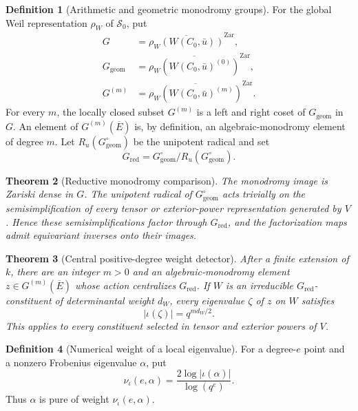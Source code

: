 \documentclass[10pt]{article}
\newtheorem{theorem}{Theorem}[section]
\theoremstyle{definition}
\newtheorem{definition}[theorem]{Definition}
\begin{document}
\begin{definition}[Arithmetic and geometric monodromy groups]
For the global Weil representation \(\rho_W\) of \(\mathcal S_0\), put
\[
 \begin{aligned}
 G&=\overline{\rho_W(W(C_0,\bar u))}^{\mathrm{Zar}},\\
 G_{\mathrm{geom}}
   &=\overline{\rho_W(W(C_0,\bar u)^{(0)})}^{\mathrm{Zar}},\\
 G^{(m)}&=
   \overline{\rho_W(W(C_0,\bar u)^{(m)})}^{\mathrm{Zar}}.
 \end{aligned}
\]
For every \(m\), the locally closed subset \(G^{(m)}\) is a left and
right coset of \(G_{\mathrm{geom}}\) in \(G\).  An element of
\(G^{(m)}(\overline E)\) is, by definition, an algebraic-monodromy element
of degree \(m\).
Let \(R_u(G_{\mathrm{geom}}^\circ)\) be the unipotent radical and set
\[
 G_{\mathrm{red}}=G_{\mathrm{geom}}^\circ/
                   R_u(G_{\mathrm{geom}}^\circ).
\]
\end{definition}

\begin{theorem}[Reductive monodromy comparison]
The monodromy image is Zariski dense in \(G\).  The unipotent radical of
\(G_{\mathrm{geom}}^\circ\) acts trivially on the semisimplification of
every tensor or exterior-power representation generated by \(V\).  Hence
these semisimplifications factor through \(G_{\mathrm{red}}\), and the
factorization maps admit equivariant inverses onto their images.
\end{theorem}

\begin{theorem}[Central positive-degree weight detector]
After a finite extension of \(k\), there are an integer \(m>0\) and an
algebraic-monodromy element \(z\in G^{(m)}(\overline E)\) whose action
centralizes \(G_{\mathrm{red}}\).  If \(W\) is an
irreducible \(G_{\mathrm{red}}\)-constituent of determinantal weight
\(d_W\), every eigenvalue \(\zeta\) of \(z\) on \(W\) satisfies
\[
                         |\iota(\zeta)|=q^{md_W/2}.
\]
This applies to every constituent selected in tensor and exterior powers of
\(V\).
\end{theorem}

\begin{definition}[Numerical weight of a local eigenvalue]
For a degree-\(e\) point and a nonzero Frobenius eigenvalue \(\alpha\), put
\[
 \nu_\iota(e,\alpha)=
       \frac{2\log|\iota(\alpha)|}{\log(q^e)}.
\]
Thus \(\alpha\) is pure of weight \(\nu_\iota(e,\alpha)\).
\end{definition}
\end{document}
